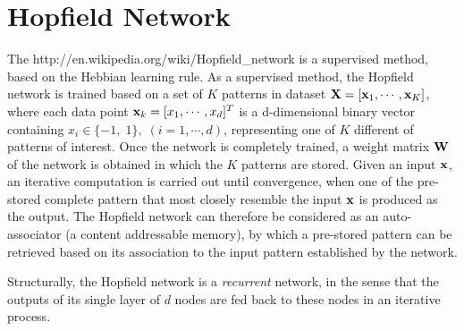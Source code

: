 \documentclass{article}
\begin{document}
\section*{Hopfield Network}


The 
{http://en.wikipedia.org/wiki/Hopfield_network}
is a supervised method, based on the Hebbian learning rule. As a
supervised method, the Hopfield network is trained based on a set 
of $K$ patterns in dataset ${\bf X}=[{\bf x}_1,\cdots,{\bf x}_K]$, 
where each data point ${\bf x}_k=[x_1,\cdots,x_d]^T$ is a d-dimensional 
binary vector containing $x_i \in\{-1,\;1\},\;(i=1,\cdots,d)$, 
representing one of $K$ different of patterns of interest. Once the
network is completely trained, a weight matrix ${\bf W}$ of the network
is obtained in which the $K$ patterns are stored. Given an input 
${\bf x}$, an iterative computation is carried out until convergence, 
when one of the pre-stored complete pattern that most closely resemble
the input ${\bf x}$ is produced as the output. The Hopfield network 
can therefore be considered as an auto-associator (a content addressable
memory), by which a pre-stored pattern can be retrieved based on its
association to the input pattern established by the network.

Structurally, the Hopfield network is a {\em recurrent} 
network, in the sense that the outputs of its single layer of $d$
nodes are fed back to these nodes in an iterative process. 


\end{document}

